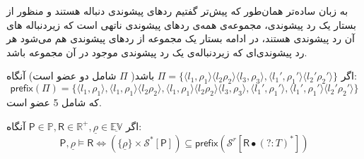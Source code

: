 به زبان ساده‌تر همان‌طور که پیش‌تر گفتیم ردهای پیشوندی دنباله هستند و منظور از بستار یک رد پیشوندی، مجموعه‌ی همه‌ی ردهای پیشوندی ناتهی است که زیردنباله های آن رد پیشوندی هستند، در ادامه بستار یک مجموعه از ردهای پیشوندی هم می‌شود هر رد پیشوندی‌ای که زیردنباله‌ی یک رد پیشوندی موجود در آن مجموعه باشد.
\begin{exm}
	اگر 
	$\Pi = \{\langle l_1 , \rho_1 \rangle  \langle l_2  \rho_2 \rangle  \langle l_3 , \rho_3 \rangle 
	,
	\langle {l_1}' , {\rho_1}' \rangle  \langle {l_2}'  {\rho_2}' \rangle
	\}$ 
	باشد( $\Pi$ شامل دو عضو است) آنگاه:
	$$
	\mathsf{prefix}(\Pi)=
	\{
	\langle l_1 , \rho_1 \rangle ,
	\langle l_1 , \rho_1 \rangle  \langle l_2  \rho_2 \rangle,
	\langle l_1 , \rho_1 \rangle  \langle l_2  \rho_2 \rangle  \langle l_3 , \rho_3 \rangle ,
	\langle {l_1}' , {\rho_1}' \rangle,
	\langle {l_1}' , {\rho_1}' \rangle  \langle {l_2}'  {\rho_2}' \rangle
	\}
	$$
	که شامل 5 عضو است.
\end{exm}

\begin{defn}
	اگر 
	$\mathsf{P}\in\mathbb{P} , \mathsf{R} \in \mathbb{R}^+ , \underline{\rho} \in \underline{\mathbb{EV}}$
	آنگاه:
	$$\mathsf{P},\underline{\rho} \models \mathsf{R}
	 \Leftrightarrow
	(\{\underline{\rho}\}\times \mathcal{S}^* [\mathsf{P}]) \subseteq 
	\mathsf{prefix} (\mathcal{S}^r [\mathsf{R} \bullet (?:\mathit{T})^*])
	$$
\end{defn}





